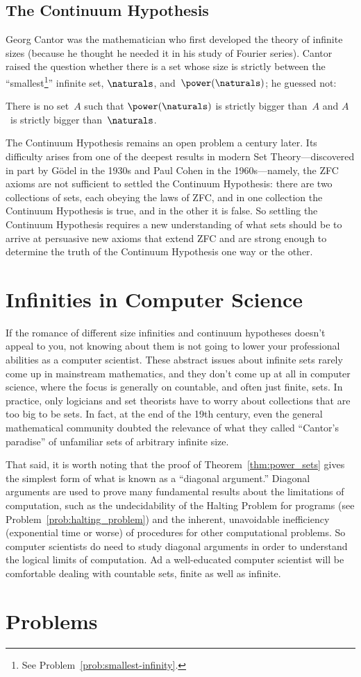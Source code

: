 \subsection{The Continuum Hypothesis}

Georg Cantor was the mathematician who first developed the theory of
infinite sizes (because he thought he needed it in his study of
Fourier series).  Cantor raised the question whether there is a set
whose size is strictly between the ``smallest\footnote{See
  Problem~\ref{prob:smallest-infinity}.}'' infinite set, $\naturals$,
and~$\power(\naturals)$; he guessed not:
\begin{cont_hypo*}
There is no set~$A$ such that $\power(\naturals)$ is strictly bigger
than~$A$ and $A$~is strictly bigger than~$\naturals$.
\end{cont_hypo*}

The Continuum Hypothesis remains an open problem a century later.  Its
difficulty arises from one of the deepest results in modern Set
Theory---discovered in part by G\"odel in the 1930s and Paul Cohen in
the 1960s---namely, the ZFC axioms are not sufficient to settled the
Continuum Hypothesis: there are two collections of sets, each obeying
the laws of ZFC, and in one collection the Continuum Hypothesis is
true, and in the other it is false.  So settling the Continuum
Hypothesis requires a new understanding of what sets should be to
arrive at persuasive new axioms that extend ZFC and are strong enough
to determine the truth of the Continuum Hypothesis one way or the
other.

\section{Infinities in Computer Science}

If the romance of different size infinities and continuum hypotheses
doesn't appeal to you, not knowing about them is not going to lower
your professional abilities as a computer scientist.  These abstract
issues about infinite sets rarely come up in mainstream mathematics,
and they don't come up at all in computer science, where the focus is
generally on countable, and often just finite, sets.  In practice,
only logicians and set theorists have to worry about collections that
are too big to be sets.  In fact, at the end of the 19th century, even
the general mathematical community doubted the relevance of what they
called ``Cantor's paradise'' of unfamiliar sets of arbitrary infinite
size.

That said, it is worth noting that the proof of
Theorem~\ref{thm:power_sets} gives the simplest form of what is known
as a ``diagonal argument.''  Diagonal arguments are used to prove many
fundamental results about the limitations of computation, such as the
undecidability of the Halting Problem for programs (see
Problem~\ref{prob:halting_problem}) and the inherent, unavoidable
inefficiency (exponential time or worse) of procedures for other
computational problems.  So computer scientists do need to study
diagonal arguments in order to understand the logical limits of
computation.  Ad a well-educated computer scientist will be
comfortable dealing with countable sets, finite as well as infinite.

\section{Problems}

\endinput
